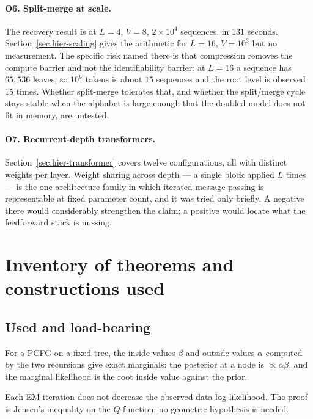 \paragraph{O6. Split-merge at scale.}
The recovery result is at $L=4$, $V=8$, $2\times10^4$ sequences, in $131$
seconds. Section~\ref{sec:hier-scaling} gives the arithmetic for $L=16$,
$V=10^3$ but no measurement. The specific risk named there is that compression
removes the compute barrier and not the identifiability barrier: at $L=16$ a
sequence has $65{,}536$ leaves, so $10^6$ tokens is about $15$ sequences and the
root level is observed $15$ times. Whether split-merge tolerates that, and
whether the split/merge cycle stays stable when the alphabet is large enough
that the doubled model does not fit in memory, are untested.

\paragraph{O7. Recurrent-depth transformers.}
Section~\ref{sec:hier-transformer} covers twelve configurations, all with
distinct weights per layer. Weight sharing across depth --- a single block
applied $L$ times --- is the one architecture family in which iterated message
passing is representable at fixed parameter count, and it was tried only
briefly. A negative there would considerably strengthen the claim; a positive
would locate what the feedforward stack is missing.


\section{Inventory of theorems and constructions used}
\label{sec:hier-inventory}

\subsection*{Used and load-bearing}

\begin{theorem}
\label{thm:inside}
For a PCFG on a fixed tree, the inside values $\beta$ and outside values
$\alpha$ computed by the two recursions give exact marginals: the posterior at
a node is $\propto \alpha\beta$, and the marginal likelihood is the root inside
value against the prior.
\end{theorem}

\begin{theorem}
\label{thm:em}
Each EM iteration does not decrease the observed-data log-likelihood. The proof
is Jensen's inequality on the $Q$-function; no geometric hypothesis is needed.
\end{theorem}

